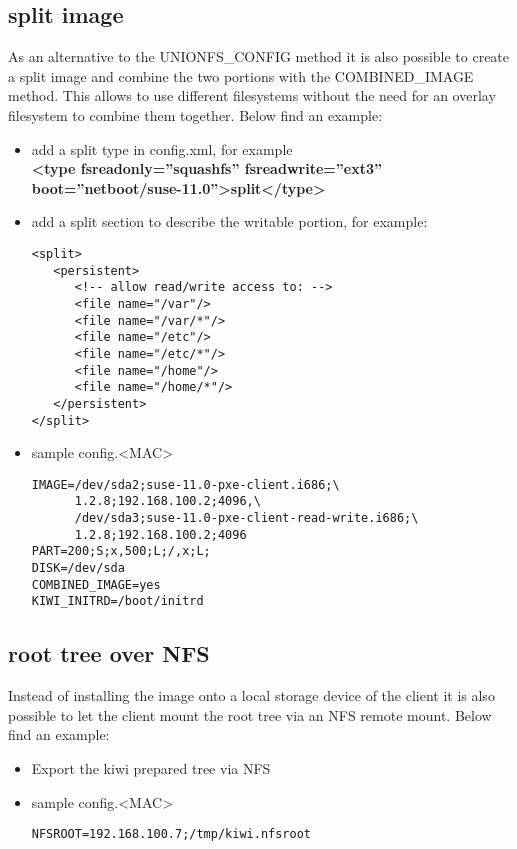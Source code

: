 \subsection{split image}

As an alternative to the UNIONFS\_CONFIG method it is also
possible to create a split image and combine the two portions
with the COMBINED\_IMAGE method. This allows to use different
filesystems without the need for an overlay filesystem to combine
them together. Below find an example:

\begin{itemize}
\item add a split type in config.xml, for example\\
      \textbf{<type fsreadonly=''squashfs'' fsreadwrite=''ext3''
      boot=''netboot/suse-11.0''>split</type>}
\item add a split section to describe the writable portion,
      for example:
\begin{verbatim}
<split>
   <persistent>
      <!-- allow read/write access to: -->
      <file name="/var"/>
      <file name="/var/*"/>
      <file name="/etc"/>
      <file name="/etc/*"/>
      <file name="/home"/>
      <file name="/home/*"/>
   </persistent>
</split>
\end{verbatim}
\item sample config.<MAC>
     
\begin{Command}{14cm}
\begin{verbatim}
IMAGE=/dev/sda2;suse-11.0-pxe-client.i686;\
      1.2.8;192.168.100.2;4096,\
      /dev/sda3;suse-11.0-pxe-client-read-write.i686;\
      1.2.8;192.168.100.2;4096
PART=200;S;x,500;L;/,x;L;
DISK=/dev/sda
COMBINED_IMAGE=yes
KIWI_INITRD=/boot/initrd
\end{verbatim}
\end{Command}
\end{itemize}

\subsection{root tree over NFS}

Instead of installing the image onto a local storage device of
the client it is also possible to let the client mount the root
tree via an NFS remote mount. Below find an example:

\begin{itemize}
\item Export the kiwi prepared tree via NFS
\item sample config.<MAC>

\begin{Command}{12cm}
\begin{verbatim}
NFSROOT=192.168.100.7;/tmp/kiwi.nfsroot
\end{verbatim}
\end{Command}
\end{itemize}

